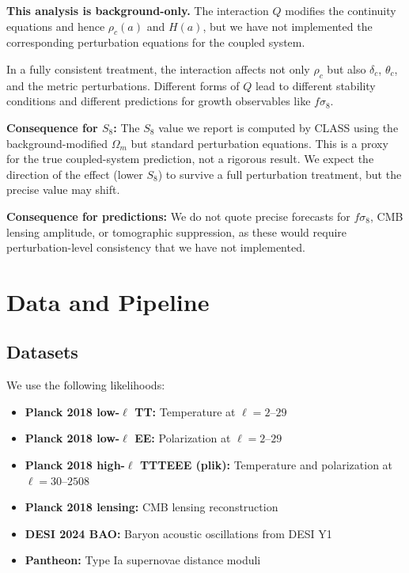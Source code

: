 \documentclass[twocolumn,showpacs,preprintnumbers,amsmath,amssymb,prd]{revtex4-2}
\begin{document}
\textbf{This analysis is background-only.} The interaction $Q$ modifies the continuity equations and hence $\rho_c(a)$ and $H(a)$, but we have not implemented the corresponding perturbation equations for the coupled system.

In a fully consistent treatment, the interaction affects not only $\rho_c$ but also $\delta_c$, $\theta_c$, and the metric perturbations. Different forms of $Q$ lead to different stability conditions and different predictions for growth observables like $f\sigma_8$.

\textbf{Consequence for $S_8$:} The $S_8$ value we report is computed by CLASS using the background-modified $\Omega_m$ but standard perturbation equations. This is a proxy for the true coupled-system prediction, not a rigorous result. We expect the direction of the effect (lower $S_8$) to survive a full perturbation treatment, but the precise value may shift.

\textbf{Consequence for predictions:} We do not quote precise forecasts for $f\sigma_8$, CMB lensing amplitude, or tomographic suppression, as these would require perturbation-level consistency that we have not implemented.

\section{Data and Pipeline}
\label{sec:data}

\subsection{Datasets}

We use the following likelihoods:
\begin{itemize}
    \item \textbf{Planck 2018 low-$\ell$ TT:} Temperature at $\ell = 2$--$29$
    \item \textbf{Planck 2018 low-$\ell$ EE:} Polarization at $\ell = 2$--$29$
    \item \textbf{Planck 2018 high-$\ell$ TTTEEE (plik):} Temperature and polarization at $\ell = 30$--$2508$
    \item \textbf{Planck 2018 lensing:} CMB lensing reconstruction
    \item \textbf{DESI 2024 BAO:} Baryon acoustic oscillations from DESI Y1
    \item \textbf{Pantheon:} Type Ia supernovae distance moduli
\end{itemize}
\end{document}
